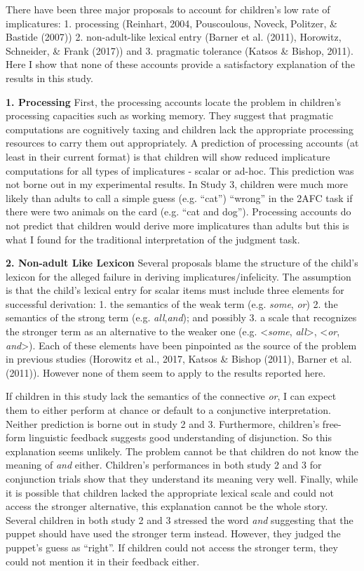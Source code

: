 \documentclass[oneside]{report}
\theoremstyle{definition}
\theoremstyle{definition}
\theoremstyle{definition}
\theoremstyle{remark}
\begin{document}
There have been three major proposals to account for children's low rate
of implicatures: 1. processing (Reinhart, 2004, Pouscoulous, Noveck,
Politzer, \& Bastide (2007)) 2. non-adult-like lexical entry (Barner et
al. (2011), Horowitz, Schneider, \& Frank (2017)) and 3. pragmatic
tolerance (Katsos \& Bishop, 2011). Here I show that none of these
accounts provide a satisfactory explanation of the results in this
study.

\textbf{1. Processing} First, the processing accounts locate the problem
in children's processing capacities such as working memory. They suggest
that pragmatic computations are cognitively taxing and children lack the
appropriate processing resources to carry them out appropriately. A
prediction of processing accounts (at least in their current format) is
that children will show reduced implicature computations for all types
of implicatures - scalar or ad-hoc. This prediction was not borne out in
my experimental results. In Study 3, children were much more likely than
adults to call a simple guess (e.g. ``cat'') ``wrong'' in the 2AFC task
if there were two animals on the card (e.g. ``cat and dog''). Processing
accounts do not predict that children would derive more implicatures
than adults but this is what I found for the traditional interpretation
of the judgment task.

\textbf{2. Non-adult Like Lexicon} Several proposals blame the structure
of the child's lexicon for the alleged failure in deriving
implicatures/infelicity. The assumption is that the child's lexical
entry for scalar items must include three elements for successful
derivation: 1. the semantics of the weak term (e.g. \emph{some},
\emph{or}) 2. the semantics of the strong term (e.g.
\emph{all},\emph{and}); and possibly 3. a scale that recognizes the
stronger term as an alternative to the weaker one (e.g.
\textless{}\emph{some}, \emph{all}\textgreater{}, \textless{}\emph{or},
\emph{and}\textgreater{}). Each of these elements have been pinpointed
as the source of the problem in previous studies (Horowitz et al., 2017,
Katsos \& Bishop (2011), Barner et al. (2011)). However none of them
seem to apply to the results reported here.

If children in this study lack the semantics of the connective
\emph{or}, I can expect them to either perform at chance or default to a
conjunctive interpretation. Neither prediction is borne out in study 2
and 3. Furthermore, children's free-form linguistic feedback suggests
good understanding of disjunction. So this explanation seems unlikely.
The problem cannot be that children do not know the meaning of
\emph{and} either. Children's performances in both study 2 and 3 for
conjunction trials show that they understand its meaning very well.
Finally, while it is possible that children lacked the appropriate
lexical scale and could not access the stronger alternative, this
explanation cannot be the whole story. Several children in both study 2
and 3 stressed the word \emph{and} suggesting that the puppet should
have used the stronger term instead. However, they judged the puppet's
guess as ``right''. If children could not access the stronger term, they
could not mention it in their feedback either.
\end{document}
